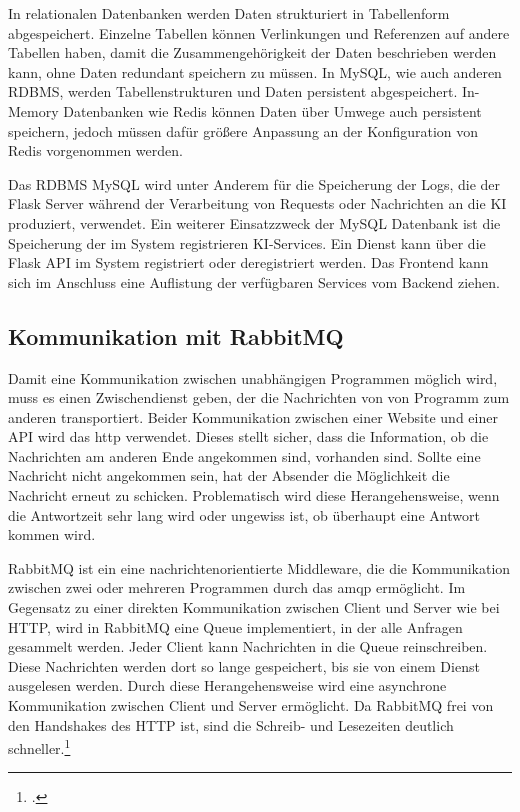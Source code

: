 In relationalen Datenbanken werden Daten strukturiert in Tabellenform abgespeichert. Einzelne Tabellen können Verlinkungen und Referenzen auf andere Tabellen haben, damit die Zusammengehörigkeit der Daten beschrieben werden kann, ohne Daten redundant speichern zu müssen. In MySQL, wie auch anderen RDBMS, werden Tabellenstrukturen und Daten persistent abgespeichert. In-Memory Datenbanken wie Redis können Daten über Umwege auch persistent speichern, jedoch müssen dafür größere Anpassung an der Konfiguration von Redis vorgenommen werden.

Das RDBMS MySQL wird unter Anderem für die Speicherung der Logs, die der Flask Server während der Verarbeitung von Requests oder Nachrichten an die KI produziert, verwendet. Ein weiterer Einsatzzweck der MySQL Datenbank ist die Speicherung der im System registrieren KI-Services. Ein Dienst kann über die Flask API im System registriert oder deregistriert werden. Das Frontend kann sich im Anschluss eine Auflistung der verfügbaren Services vom Backend ziehen.

\subsection{Kommunikation mit RabbitMQ}
Damit eine Kommunikation zwischen unabhängigen Programmen möglich wird, muss es einen Zwischendienst geben, der die Nachrichten von von Programm zum anderen transportiert. Beider Kommunikation zwischen einer Website und einer API wird das \ac{http} verwendet. Dieses stellt sicher, dass die Information, ob die Nachrichten am anderen Ende angekommen sind, vorhanden sind. Sollte eine Nachricht nicht angekommen sein, hat der Absender die Möglichkeit die Nachricht erneut zu schicken. Problematisch wird diese Herangehensweise, wenn die Antwortzeit sehr lang wird oder ungewiss ist, ob überhaupt eine Antwort kommen wird. 

RabbitMQ ist ein eine nachrichtenorientierte Middleware, die die Kommunikation zwischen zwei oder mehreren Programmen durch das  \ac{amqp} ermöglicht. Im Gegensatz zu einer direkten Kommunikation zwischen Client und Server wie bei HTTP, wird in RabbitMQ eine Queue implementiert, in der alle Anfragen gesammelt werden. Jeder Client kann Nachrichten in die Queue reinschreiben. Diese Nachrichten werden dort so lange gespeichert, bis sie von einem Dienst ausgelesen werden. Durch diese Herangehensweise wird eine asynchrone Kommunikation zwischen Client und Server ermöglicht. Da RabbitMQ frei von den Handshakes des HTTP ist, sind die Schreib- und Lesezeiten deutlich schneller.\footcite{ionescu2015analysis}

